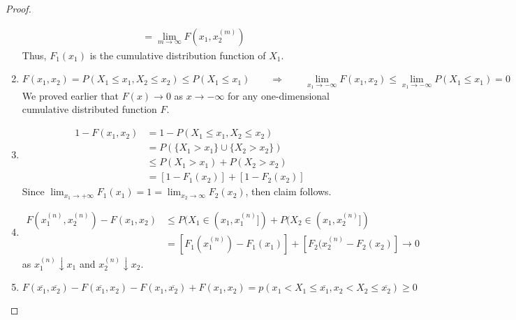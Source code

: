 \begin{proof}
\begin{enumerate}[noitemsep, topsep=0em]
\begin{align*}
                    &= \lim_{m \rightarrow \infty} F\left( 
                           x_1, x_2^{(m)}
                       \right)
\end{align*}
Thus, $F_1(x_1)$ is the cumulative distribution function of $X_1$.
\item
\[
    F(x_1, x_2) = P(X_1 \leq x_1, X_2 \leq x_2) \leq P(X_1 \leq x_1)
    \qquad \Rightarrow \qquad
    \lim_{x_1 \rightarrow -\infty} F(x_1, x_2) \leq
    \lim_{x_1 \rightarrow -\infty} P(X_1 \leq x_1) = 0
\]
\note We proved earlier that $F(x) \rightarrow 0$ as $x \rightarrow -\infty$
for any one-dimensional cumulative distributed function $F$.
\item
\begin{align*}
    1 - F(x_1, x_2) &= 1 - P(X_1 \leq x_1, X_2 \leq x_2)                     \\
                    &= P(\lbrace X_1 > x_1 \rbrace \cup 
                        \lbrace X_2 > x_2 \rbrace)                           \\
                    &\leq P(X_1 > x_1) + P(X_2 > x_2)                        \\
                    &= [1 - F_1(x_2)] + [1 - F_2(x_2)]
\end{align*}
Since $\lim_{x_1 \rightarrow +\infty} F_1(x_1) = 1 = \lim_{x_2 \rightarrow
\infty} F_2(x_2)$, then claim follows.
\item
\begin{align*}
      F(x_1^{(n)}, x_2^{(n)}) - F(x_1, x_2)                     
    &\leq P(X_1 \in (x_1, x_1^{(n)}]) + P(X_2 \in (x_1, x_2^{(n)}])          \\
    &= [F_1(x_1^{(n)}) - F_1(x_1)] + [F_2(x_2^{(n)} - F_2(x_2)]
    \rightarrow 0
\end{align*}
as $x_1^{(n)} \downarrow x_1$ and $x_2^{(n)} \downarrow x_2$.
\item
\[
     F(\overline{x_1}, \overline{x_2}) - F(\overline{x_1}, x_2) -
     F(x_1, \overline{x_2}) + F(x_1, x_2)
    = p(x_1 < X_1 \leq \overline{x_1}, x_2 < X_2 \leq \overline{x_2 })
    \geq 0
\]
\end{enumerate}
\end{proof}
